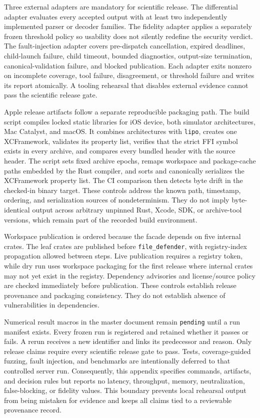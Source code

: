 Three external adapters are mandatory for scientific release. The differential
adapter evaluates every accepted output with at least two independently
implemented parser or decoder families. The fidelity adapter applies a
separately frozen threshold policy so usability does not silently redefine the
security verdict. The fault-injection adapter covers pre-dispatch
cancellation, expired deadlines, child-launch failure, child timeout, bounded
diagnostics, output-size termination, canonical-validation failure, and
blocked publication. Each adapter exits nonzero on incomplete coverage, tool
failure, disagreement, or threshold failure and writes its report atomically.
A tooling rehearsal that disables external evidence cannot pass the scientific
release gate.

Apple release artifacts follow a separate reproducible packaging path. The
build script compiles locked static libraries for iOS device, both simulator
architectures, Mac Catalyst, and macOS. It combines architectures with
\texttt{lipo}, creates one XCFramework, validates its property list, verifies
that the strict FFI symbol exists in every archive, and compares every bundled
header with the source header.  The script sets fixed archive epochs, remaps
workspace and package-cache paths embedded by the Rust compiler, and sorts and
canonically serializes the XCFramework property list.  The CI comparison then
detects byte drift in the checked-in binary target.  These controls address the
known path, timestamp, ordering, and serialization sources of nondeterminism.
They do not imply byte-identical output across arbitrary unpinned Rust, Xcode,
SDK, or archive-tool versions, which remain part of the recorded build
environment.

Workspace publication is ordered because the facade depends on five internal
crates. The leaf crates are published before \texttt{file\_defender}, with
registry-index propagation allowed between steps. Live publication requires a
registry token, while dry run uses workspace packaging for the first release
where internal crates may not yet exist in the registry. Dependency advisories
and license/source policy are checked immediately before publication. These
controls establish release provenance and packaging consistency. They do not
establish absence of vulnerabilities in dependencies.

Numerical result macros in the master document remain \texttt{pending} until a
run manifest exists. Every frozen run is registered and retained whether it
passes or fails. A rerun receives a new identifier and links its predecessor and
reason. Only release claims require every scientific release gate to pass. Tests,
coverage-guided fuzzing, fault injection, and benchmarks are intentionally
deferred to that controlled server run. Consequently, this appendix specifies
commands, artifacts, and decision rules but reports no latency, throughput,
memory, neutralization, false-blocking, or fidelity values. This boundary
prevents local rehearsal output from being mistaken for evidence and keeps all
claims tied to a reviewable provenance record.
